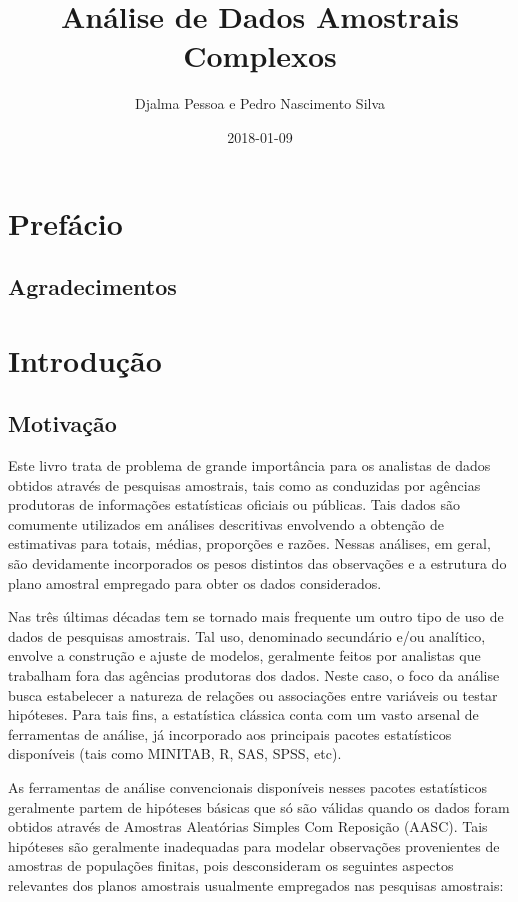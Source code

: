 \documentclass[]{book}
\title{Análise de Dados Amostrais Complexos}
\author{Djalma Pessoa e Pedro Nascimento Silva}
\date{2018-01-09}
\theoremstyle{definition}
\theoremstyle{definition}
\theoremstyle{definition}
\theoremstyle{remark}
\begin{document}
\maketitle

{
\setcounter{tocdepth}{1}
\tableofcontents
}
\chapter*{Prefácio}\label{prefacio}

\section*{Agradecimentos}\label{agradecimentos}

\chapter{Introdução}\label{introduc}

\section{Motivação}\label{motivacao}

Este livro trata de problema de grande importância para os analistas de
dados obtidos através de pesquisas amostrais, tais como as conduzidas
por agências produtoras de informações estatísticas oficiais ou
públicas. Tais dados são comumente utilizados em análises descritivas
envolvendo a obtenção de estimativas para totais, médias, proporções e
razões. Nessas análises, em geral, são devidamente incorporados os pesos
distintos das observações e a estrutura do plano amostral empregado para
obter os dados considerados.

Nas três últimas décadas tem se tornado mais frequente um outro tipo de
uso de dados de pesquisas amostrais. Tal uso, denominado secundário e/ou
analítico, envolve a construção e ajuste de modelos, geralmente feitos
por analistas que trabalham fora das agências produtoras dos dados.
Neste caso, o foco da análise busca estabelecer a natureza de relações
ou associações entre variáveis ou testar hipóteses. Para tais fins, a
estatística clássica conta com um vasto arsenal de ferramentas de
análise, já incorporado aos principais pacotes estatísticos disponíveis
(tais como MINITAB, R, SAS, SPSS, etc).

As ferramentas de análise convencionais disponíveis nesses pacotes
estatísticos geralmente partem de hipóteses básicas que só são válidas
quando os dados foram obtidos através de Amostras Aleatórias Simples Com
Reposição (AASC). Tais hipóteses são geralmente inadequadas para modelar
observações provenientes de amostras de populações finitas, pois
desconsideram os seguintes aspectos relevantes dos planos amostrais
usualmente empregados nas pesquisas amostrais:
\end{document}
